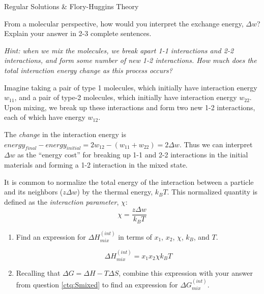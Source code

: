 \begin{activity}{Regular Solutions \& Flory-Huggins Theory}
\begin{ctqs}
		
	\question From a molecular perspective, how would you interpret the exchange energy, $\Delta w$?  Explain your answer in 2-3 complete sentences.
	
		\emph{Hint: when we mix the molecules, we break apart 1-1 interactions and 2-2 interactions, and form some number of new 1-2 interactions.  How much does the total interaction energy change as this process occurs?}
		
		\begin{solution}[2in]{}
		
			Imagine taking a pair of type 1 molecules, which initially have interaction energy $w_{11}$, and a pair of type-2 molecules, which initially have interaction energy $w_{22}$.  Upon mixing, we break up these interactions and form two new 1-2 interactions, each of which have energy $w_{12}$.
			
			The \emph{change} in the interaction energy is $energy_{final} - energy_{initial} = 2w_{12} - (w_{11} + w_{22}) = 2\Delta w$.  Thus we can interpret $\Delta w$ as the ``energy cost'' for breaking up 1-1 and 2-2 interactions in the initial materials and forming a 1-2 interaction in the mixed state.
			
		\end{solution}
			

	\question It is common to normalize the total energy of the interaction  between a particle and its neighbors ($z\Delta w$) by the thermal energy, $k_BT$.  This normalized quantity is defined as the \emph{interaction parameter}, $\chi$:
		\begin{equation*}
			\chi = \frac{z\Delta w}{k_B T}
		\end{equation*}
	
		\begin{enumerate}
			\item Find an expression for $\Delta H_{mix}^{(int)}$ in terms of $x_1$, $x_2$, $\chi$, $k_B$, and $T$.
		
			\begin{solution}[1.25in]{}
				\begin{equation*}
					\Delta H_{mix}^{(int)} = x_1 x_2 \chi k_B T
				\end{equation*}
			\end{solution}

			\item Recalling that $\Delta G = \Delta H - T\Delta S$, combine this expression with your answer from question \ref{ctq:Smixed} to find an expression for $\Delta G_{mix}^{(int)}$.
			

\end{enumerate}
\end{ctqs}
\end{activity}
